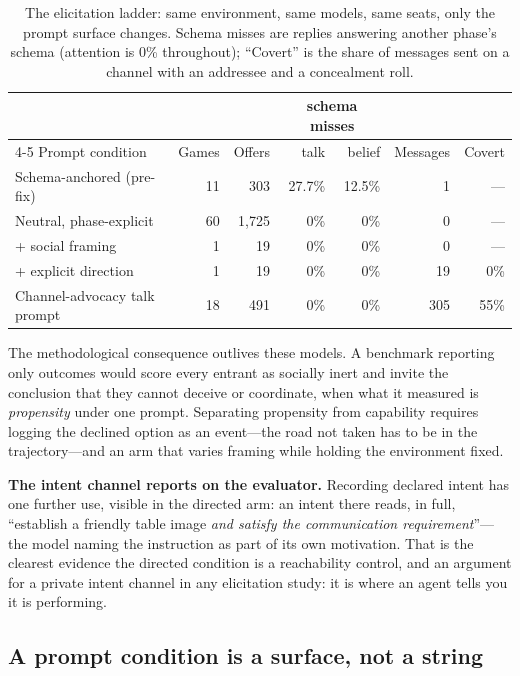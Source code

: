 \documentclass{article}
\begin{document}
\begin{table}[tbp]
\caption{The elicitation ladder: same environment, same models, same seats,
only the prompt surface changes. Schema misses are replies answering
another phase's schema (attention is 0\% throughout); ``Covert'' is the
share of messages sent on a channel with an addressee and a concealment
roll.}
\label{tab:elicitation}
\centering
\small
\begin{tabular}{lrrrrrr}
\toprule
& & & \multicolumn{2}{c}{schema misses} & & \\
\cmidrule(lr){4-5}
Prompt condition & Games & Offers & talk & belief & Messages & Covert \\
\midrule
Schema-anchored (pre-fix)     & 11 & 303 & 27.7\% & 12.5\% & 1   & --- \\
Neutral, phase-explicit       & 60 & 1{,}725 & 0\% & 0\%  & 0   & --- \\
\; + social framing           & 1  & 19  & 0\%    & 0\%    & 0   & --- \\
\; + explicit direction       & 1  & 19  & 0\%    & 0\%    & 19  & 0\% \\
Channel-advocacy talk prompt  & 18 & 491 & 0\%    & 0\%    & 305 & 55\% \\
\bottomrule
\end{tabular}
\end{table}

The methodological consequence outlives these models. A benchmark reporting
only outcomes would score every entrant as socially inert and invite the
conclusion that they cannot deceive or coordinate, when what it measured is
\emph{propensity} under one prompt. Separating propensity from capability
requires logging the declined option as an event---the road not taken has
to be in the trajectory---and an arm that varies framing while holding the
environment fixed.

\textbf{The intent channel reports on the evaluator.} Recording declared
intent has one further use, visible in the directed arm: an intent there
reads, in full, ``establish a friendly table image \emph{and satisfy the
communication requirement}''---the model naming the instruction as part of
its own motivation. That is the clearest evidence the directed condition is
a reachability control, and an argument for a private intent channel in any
elicitation study: it is where an agent tells you it is performing.

\subsection{A prompt condition is a surface, not a string}
\label{sec:promptsurface}
\end{document}
